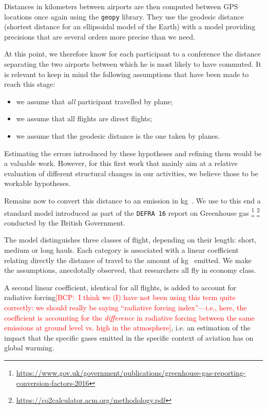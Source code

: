 \documentclass{scrartcl}
\newcommand{\bcp}[1]{\textcolor{red}{{[BCP:~#1]}}}
\newcommand{\bcp}[1]{}
\newcommand{\gaz}{\si{\kilogram\of{CO_2e}}}
\begin{document}
Distances in kilometers between airports are then computed between GPS locations
once again using the \texttt{geopy} library. They use the geodesic distance
(shortest distance for an ellipsoidal model of the Earth) with a model providing
precisions that are several orders more precise than we need.

At this point, we therefore know for each participant to a conference the
distance separating the two airports between which he is most likely to have
commuted. It is relevant to keep in mind the following assumptions that have
been made to reach this stage:
\begin{itemize}
\item we assume that \emph{all} participant travelled by plane;
\item we assume that all flights are direct flights;
\item we assume that the geodesic distance is the one taken by planes.
\end{itemize}

Estimating the errors introduced by these hypotheses and refining them would be
a valuable work. However, for this first work that mainly aim at a relative
evaluation of different structural changes in our activities, we believe those
to be workable hypotheses.

Remains now to convert this distance to an emission in \gaz. We use to this end
a standard model introduced as part of the \texttt{DEFRA 16} report on
Greenhouse gas
\footnote{\url{https://www.gov.uk/government/publications/greenhouse-gas-reporting-conversion-factors-2016}}
\footnote{\url{https://co2calculator.acm.org/methodology.pdf}}
conducted by the British Government.

The model distinguishes three classes of flight, depending on their length:
short, medium or long hauls. Each category is associated with a linear
coefficient relating directly the distance of travel to the amount of \gaz
emitted. We make the assumptions, anecdotally observed, that researchers all
fly in economy class.

A second linear coefficient, identical for all flights, is added to
account for radiative forcing\bcp{I think we (I) have not been using this
  term quite correctly: we should really be saying ``radiative forcing
  index''---i.e., here, the coefficient is accounting for the {\em
    difference} in radiative forcing between the same emissions at ground
  level vs. high in the atmosphere}, i.e. an estimation of the impact that the
specific gases emitted in the specific context of aviation has on global
warming.
\end{document}

